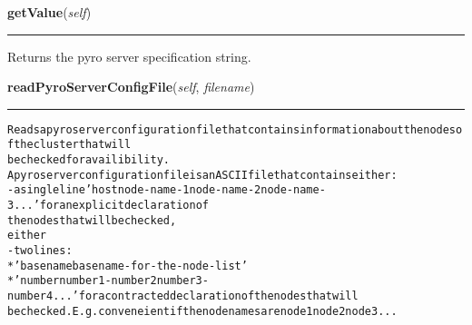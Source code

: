 \hspace{.8\funcindent}\begin{boxedminipage}{\funcwidth}

    \raggedright \textbf{getValue}(\textit{self})

    \vspace{-1.5ex}

    \rule{\textwidth}{0.5\fboxrule}
\setlength{\parskip}{2ex}
    Returns the pyro server specification string.

\setlength{\parskip}{1ex}
    \end{boxedminipage}

    \label{nMOLDYN:GUI:PyroServerDialog:PyroServerDialog:readPyroServerConfigFile}

    \vspace{0.5ex}

\hspace{.8\funcindent}\begin{boxedminipage}{\funcwidth}

    \raggedright \textbf{readPyroServerConfigFile}(\textit{self}, \textit{filename})

    \vspace{-1.5ex}

    \rule{\textwidth}{0.5\fboxrule}
\setlength{\parskip}{2ex}
\begin{alltt}
Reads a pyro server configuration file that contains information about the nodes of the cluster that will
be checked for availibility.
A pyro server configuration file is an ASCII file that contains either:
    -a single line 'host node-name-1 node-name-2 node-name-3...' for an explicit declaration of 
    the nodes that will be checked,
either
    -two lines:
        *'basename basename-for-the-node-list'
        *'number number1-number2 number3-number4 ...' for a contracted declaration of the nodes that will
        be checked. E.g. conveneient if the node names are node1 node2 node3 ...
\end{alltt}

\setlength{\parskip}{1ex}
    \end{boxedminipage}

    \label{nMOLDYN:GUI:PyroServerDialog:PyroServerDialog:getCPUInfo}

